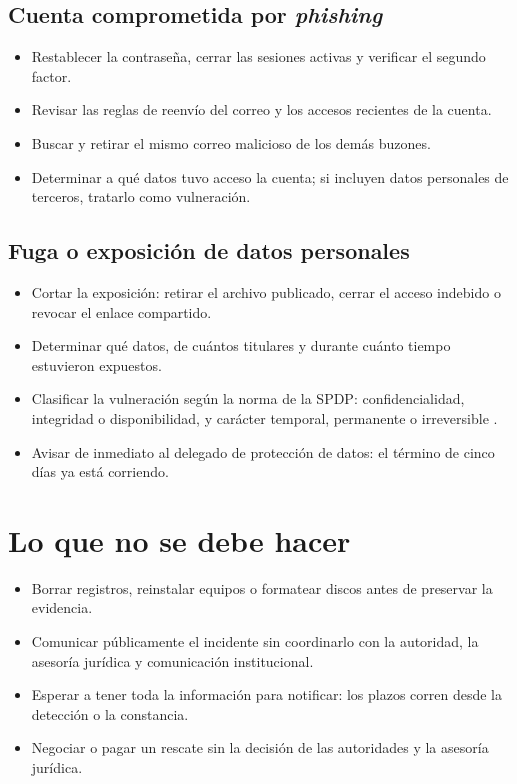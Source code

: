 \documentclass[11pt,a4paper,oneside]{report}
\begin{document}
\subsection{Cuenta comprometida por \textit{phishing}}
\begin{itemize}[leftmargin=*]
  \item Restablecer la contraseña, cerrar las sesiones activas y verificar el segundo factor.
  \item Revisar las reglas de reenvío del correo y los accesos recientes de la cuenta.
  \item Buscar y retirar el mismo correo malicioso de los demás buzones.
  \item Determinar a qué datos tuvo acceso la cuenta; si incluyen datos personales de terceros, tratarlo como vulneración.
\end{itemize}

\subsection{Fuga o exposición de datos personales}
\begin{itemize}[leftmargin=*]
  \item Cortar la exposición: retirar el archivo publicado, cerrar el acceso indebido o revocar el enlace compartido.
  \item Determinar qué datos, de cuántos titulares y durante cuánto tiempo estuvieron expuestos.
  \item Clasificar la vulneración según la norma de la SPDP: confidencialidad, integridad o disponibilidad, y carácter temporal, permanente o irreversible \cite{spdp2026norma}.
  \item Avisar de inmediato al delegado de protección de datos: el término de cinco días ya está corriendo.
\end{itemize}

\section{Lo que no se debe hacer}
\begin{itemize}[leftmargin=*]
  \item Borrar registros, reinstalar equipos o formatear discos antes de preservar la evidencia.
  \item Comunicar públicamente el incidente sin coordinarlo con la autoridad, la asesoría jurídica y comunicación institucional.
  \item Esperar a tener toda la información para notificar: los plazos corren desde la detección o la constancia.
  \item Negociar o pagar un rescate sin la decisión de las autoridades y la asesoría jurídica.
\end{itemize}
\end{document}
